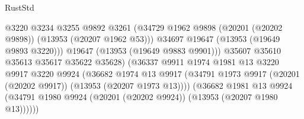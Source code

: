\begin{lexlean}{RustStd}
\begin{coremodule}
                                              @3220
                                              @3234
                                              @3255
                                              @9892
                                              @3261
                                              (@34729
                                                @1962
                                                @9898
                                                (@20201 (@20202 @9898))
                                                (@13953 (@20207 @1962 @53)))
                                              @34697
                                              @19647
                                              (@13953 (@19649 @9893 @3220)))
                                            @19647
                                            (@13953 (@19649 @9883 @9901)))
                                          @35607
                                          @35610
                                          @35613
                                          @35617
                                          @35622
                                          @35628)
                                        (@36337
                                          @9911
                                          @1974
                                          @1981
                                          @13
                                          @3220
                                          @9917
                                          @3220
                                          @9924
                                          (@36682
                                            @1974
                                            @13
                                            @9917
                                            (@34791
                                              @1973
                                              @9917
                                              (@20201 (@20202 @9917))
                                              (@13953 (@20207 @1973 @13))))
                                          (@36682
                                            @1981
                                            @13
                                            @9924
                                            (@34791
                                              @1980
                                              @9924
                                              (@20201 (@20202 @9924))
                                              (@13953 (@20207 @1980 @13))))))

\end{coremodule}
\end{lexlean}
